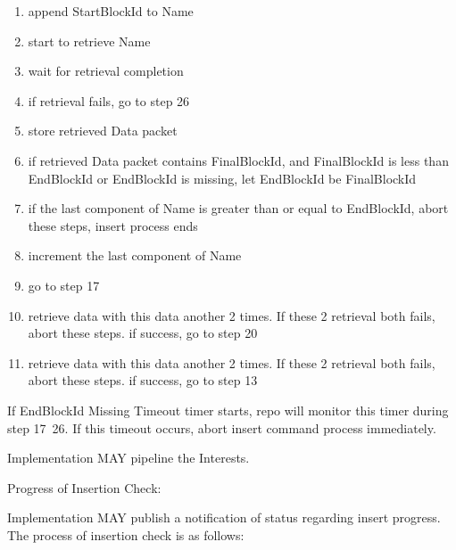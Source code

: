 \documentclass{acm_proc_article-sp}
\begin{document}
\begin{enumerate}
\item append StartBlockId to Name

\item start to retrieve Name

\item wait for retrieval completion

\item if retrieval fails, go to step 26

\item store retrieved Data packet

\item if retrieved Data packet contains FinalBlockId, and FinalBlockId is less than EndBlockId or EndBlockId is missing, let EndBlockId be FinalBlockId

\item if the last component of Name is greater than or equal to EndBlockId, abort these steps, insert process ends

\item increment the last component of Name

\item go to step 17

\item retrieve data with this data another 2 times. If these 2 retrieval both fails, abort these steps. if success, go to step 20

\item retrieve data with this data another 2 times. If these 2 retrieval both fails, abort these steps. if success, go to step 13
\end{enumerate}

If EndBlockId Missing Timeout timer starts, repo will monitor this timer during step 17~26. If this timeout occurs, abort insert command process immediately.

Implementation MAY pipeline the Interests.

Progress of Insertion Check:

Implementation MAY publish a notification of status regarding insert progress. The process of insertion check is as follows:
\end{document}
